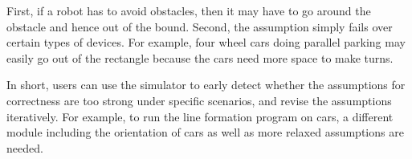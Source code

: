 
First, if a robot has to avoid obstacles,
then it may have to go around the obstacle and hence out of the bound.
Second, the assumption simply fails over certain types of devices.
For example, four wheel cars doing parallel parking may easily go out of the rectangle
because the cars need more space to make turns.

In short, users can use the simulator to early detect whether
the assumptions for correctness are too strong under specific scenarios,
and revise the assumptions iteratively.
For example, to run the line formation program on cars,
a different module including the orientation of cars as well as more relaxed assumptions are needed.
